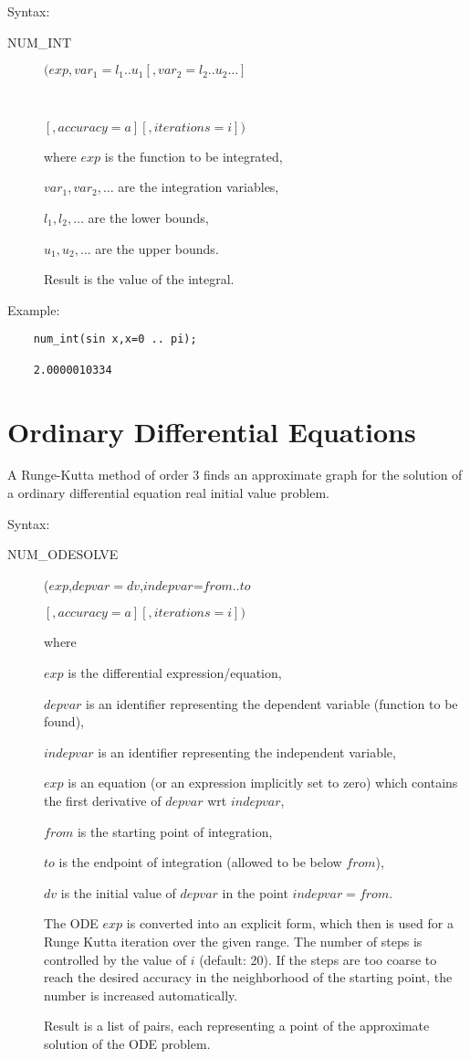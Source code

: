 Syntax:
 
\begin{description}
\item[NUM\_INT] $(exp,var_1=l_1 .. u_1 [,var_2=l_2 .. u_2 \ldots]$
\item[\ \ \ \ \ \ ]$[,accuracy=a][,iterations=i])$
 
where $exp$ is the function to be integrated,
 
$var_1, var_2 , \ldots$ are the integration variables,
 
$l_1, l_2 , \ldots$ are the lower bounds,
 
$u_1, u_2 , \ldots$ are the upper bounds.
 
Result is the value of the integral.
 
\end{description}
 
Example:
 
\begin{verbatim}
    num_int(sin x,x=0 .. pi);
 
    2.0000010334
\end{verbatim}
 
\section{Ordinary Differential Equations}
 
A Runge-Kutta method of order 3 finds an approximate graph for
the solution of a ordinary differential equation 
real initial value problem. 
 
Syntax:
\begin{description}
\item[NUM\_ODESOLVE]($exp$,$depvar=dv$,$indepvar$=$from .. to$

$                   [,accuracy=a][,iterations=i]) $
 
where 

$exp$ is the differential expression/equation,

$depvar$ is an identifier representing the dependent variable 
(function to be found),
 
$indepvar$ is an identifier representing the independent variable,

$exp$ is an equation (or an expression implicitly set to zero) which
contains the first derivative of $depvar$ wrt $indepvar$,
 
$from$ is the starting point of integration,
 
$to$ is the endpoint of integration (allowed to be below $from$),
 
$dv$ is the initial value of $depvar$ in the point $indepvar=from$.
 
The ODE $exp$ is converted into an explicit form, which then is
used for a Runge Kutta iteration over the given range. The 
number of steps is controlled by the value of $i$
(default: 20).
If the steps are too coarse to reach the desired 
accuracy in the neighborhood of the starting point, the number is
increased automatically.
 
Result is a list of pairs, each representing a point of the
approximate solution of the ODE problem.
\end{description}


